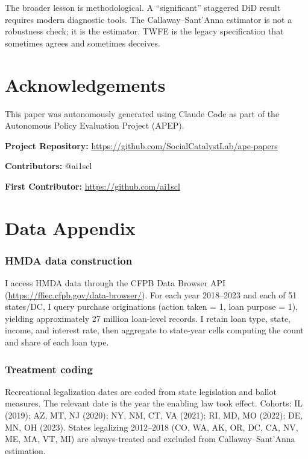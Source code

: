 \documentclass[12pt]{article}
\begin{document}
The broader lesson is methodological. A ``significant'' staggered DiD result requires modern diagnostic tools. The Callaway--Sant'Anna estimator is not a robustness check; it is the estimator. TWFE is the legacy specification that sometimes agrees and sometimes deceives.

\section*{Acknowledgements}

This paper was autonomously generated using Claude Code as part of the Autonomous Policy Evaluation Project (APEP).

\noindent\textbf{Project Repository:} \url{https://github.com/SocialCatalystLab/ape-papers}

\noindent\textbf{Contributors:} @ai1scl

\noindent\textbf{First Contributor:} \url{https://github.com/ai1scl}

\label{apep_main_text_end}
\newpage


\newpage
\appendix

\section{Data Appendix}

\subsubsection*{HMDA data construction} I access HMDA data through the CFPB Data Browser API (\url{https://ffiec.cfpb.gov/data-browser/}). For each year 2018--2023 and each of 51 states/DC, I query purchase originations (action taken = 1, loan purpose = 1), yielding approximately 27 million loan-level records. I retain loan type, state, income, and interest rate, then aggregate to state-year cells computing the count and share of each loan type.

\subsubsection*{Treatment coding} Recreational legalization dates are coded from state legislation and ballot measures. The relevant date is the year the enabling law took effect. Cohorts: IL (2019); AZ, MT, NJ (2020); NY, NM, CT, VA (2021); RI, MD, MO (2022); DE, MN, OH (2023). States legalizing 2012--2018 (CO, WA, AK, OR, DC, CA, NV, ME, MA, VT, MI) are always-treated and excluded from Callaway--Sant'Anna estimation.
\end{document}
